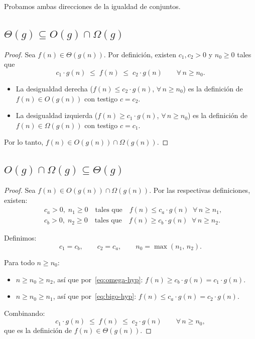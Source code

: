 \documentclass[11pt, letterpaper]{article}
\theoremstyle{definition}
\theoremstyle{plain}
\theoremstyle{remark}
\begin{document}
Probamos ambas direcciones de la igualdad de conjuntos.

\subsection{\texorpdfstring{$\Theta(g) \subseteq O(g) \cap \Omega(g)$}{Θ(g) ⊆ O(g) ∩ Ω(g)}}

\begin{proof}
  Sea $f(n) \in \Theta(g(n))$. Por definición, existen $c_1, c_2 > 0$ y
  $n_0 \geq 0$ tales que
  \[
    c_1 \cdot g(n) \;\leq\; f(n) \;\leq\; c_2 \cdot g(n)
    \qquad \forall\, n \geq n_0.
  \]

  \begin{itemize}[nosep]
    \item La desigualdad derecha ($f(n) \leq c_2 \cdot g(n)$, $\forall\, n \geq n_0$)
          es la definición de $f(n) \in O(g(n))$ con testigo $c = c_2$.
    \item La desigualdad izquierda ($f(n) \geq c_1 \cdot g(n)$, $\forall\, n \geq n_0$)
          es la definición de $f(n) \in \Omega(g(n))$ con testigo $c = c_1$.
  \end{itemize}

  Por lo tanto, $f(n) \in O(g(n)) \cap \Omega(g(n))$.
\end{proof}

\subsection{\texorpdfstring{$O(g) \cap \Omega(g) \subseteq \Theta(g)$}{O(g) ∩ Ω(g) ⊆ Θ(g)}}

\begin{proof}
  Sea $f(n) \in O(g(n)) \cap \Omega(g(n))$. Por las respectivas
  definiciones, existen:
  \begin{align}
    &c_a > 0,\; n_1 \geq 0 \quad\text{tales que}\quad
      f(n) \leq c_a \cdot g(n) \;\;\forall\, n \geq n_1,
      \label{eq:bigo-hyp} \\
    &c_b > 0,\; n_2 \geq 0 \quad\text{tales que}\quad
      f(n) \geq c_b \cdot g(n) \;\;\forall\, n \geq n_2.
      \label{eq:omega-hyp}
  \end{align}

  Definimos:
  \[
    c_1 = c_b, \qquad c_2 = c_a, \qquad n_0 = \max(n_1,\, n_2).
  \]

  Para todo $n \geq n_0$:
  \begin{itemize}[nosep]
    \item $n \geq n_0 \geq n_2$, así que por~\eqref{eq:omega-hyp}:
          $f(n) \geq c_b \cdot g(n) = c_1 \cdot g(n)$.
    \item $n \geq n_0 \geq n_1$, así que por~\eqref{eq:bigo-hyp}:
          $f(n) \leq c_a \cdot g(n) = c_2 \cdot g(n)$.
  \end{itemize}

  Combinando:
  \[
    c_1 \cdot g(n) \;\leq\; f(n) \;\leq\; c_2 \cdot g(n)
    \qquad \forall\, n \geq n_0,
  \]
  que es la definición de $f(n) \in \Theta(g(n))$.
\end{proof}
\end{document}
